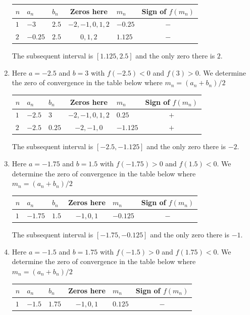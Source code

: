 \begin{posttest}
\begin{mysolution}
\begin{enumerate}[label=(\alph*)]
\begin{center}
\begin{tabular}{lllclc}\hline
$n$&$a_n$&$b_n$&Zeros here&$m_n$&Sign of $f(m_n)$\\\hline
$1$&$-3$&$2.5$&$-2, -1, 0, 1, 2$&$-0.25$&$-$\\
$2$&$-0.25$&$2.5$&$0, 1, 2$&$1.125$&$-$\\\hline
\end{tabular}
\end{center} 

The subsequent interval is $[1.125,2.5]$ and the only zero there is $2$.
\item Here $a=-2.5$ and $b=3$ with $f(-2.5)<0$ and $f(3)>0$. We determine the zero of convergence in the table below where $m_n=(a_n+b_n)/2$

\begin{center}
\begin{tabular}{lllclc}\hline
$n$&$a_n$&$b_n$&Zeros here&$m_n$&Sign of $f(m_n)$\\\hline
$1$&$-2.5$&$3$&$-2, -1, 0, 1, 2$&$0.25$&$+$\\
$2$&$-2.5$&$0.25$&$-2, -1, 0$&$-1.125$&$+$\\\hline
\end{tabular}
\end{center} 

The subsequent interval is $[-2.5,-1.125]$ and the only zero there is $-2$.
 \item Here $a=-1.75$ and $b=1.5$ with $f(-1.75)>0$ and $f(1.5)<0$. We determine the zero of convergence in the table below where $m_n=(a_n+b_n)/2$

\begin{center}
\begin{tabular}{lllclc}\hline
$n$&$a_n$&$b_n$&Zeros here&$m_n$&Sign of $f(m_n)$\\\hline
$1$&$-1.75$&$1.5$&$-1, 0, 1$&$-0.125$&$-$\\\hline
\end{tabular}
\end{center} 

The subsequent interval is $[-1.75,-0.125]$ and the only zero there is $-1$.
\item  Here $a=-1.5$ and $b=1.75$ with $f(-1.5)>0$ and $f(1.75)<0$. We determine the zero of convergence in the table below where $m_n=(a_n+b_n)/2$

\begin{center}
\begin{tabular}{lllclc}\hline
$n$&$a_n$&$b_n$&Zeros here&$m_n$&Sign of $f(m_n)$\\\hline
$1$&$-1.5$&$1.75$&$-1, 0, 1$&$0.125$&$-$\\\hline
\end{tabular}
\end{center} 


\end{enumerate}
\end{mysolution}
\end{posttest}
